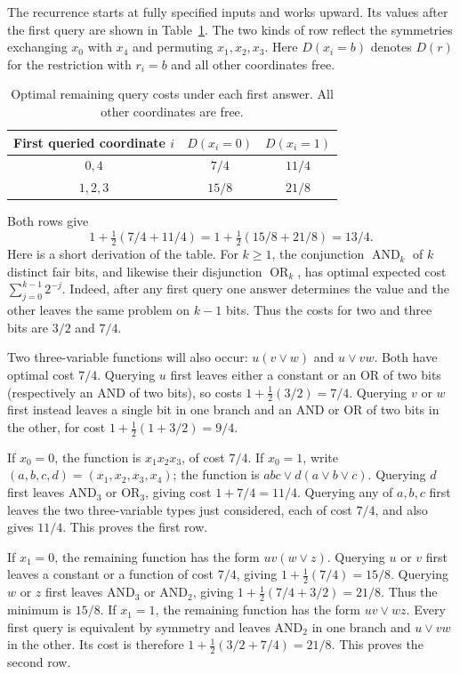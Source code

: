 \documentclass[11pt]{article}
\begin{document}
The recurrence starts at fully specified inputs and works upward. Its
values after the first query are shown in Table~\ref{tab:branches}.
The two kinds of row reflect the symmetries exchanging $x_0$ with $x_4$
and permuting $x_1,x_2,x_3$. Here $D(x_i=b)$ denotes $D(r)$ for the
restriction with $r_i=b$ and all other coordinates free.
\begin{table}[ht]
\centering
\begin{tabular}{ccc}
\toprule
First queried coordinate $i$ & $D(x_i=0)$ & $D(x_i=1)$\\
\midrule
$0,4$ & $7/4$ & $11/4$\\
$1,2,3$ & $15/8$ & $21/8$\\
\bottomrule
\end{tabular}
\caption{Optimal remaining query costs under each first answer.
All other coordinates are free.}\label{tab:branches}
\end{table}
Both rows give
\[
 1+\tfrac12(7/4+11/4)
 =1+\tfrac12(15/8+21/8)=13/4.
\]
Here is a short derivation of the table. For $k\geq1$, the conjunction
$\operatorname{AND}_k$ of $k$ distinct fair bits, and likewise their
disjunction $\operatorname{OR}_k$, has optimal expected cost
$\sum_{j=0}^{k-1}2^{-j}$. Indeed, after any first query one answer determines
the value and the other leaves the same problem on $k-1$ bits. Thus the
costs for two and three bits are $3/2$ and $7/4$.

Two three-variable functions will also occur: $u(v\lor w)$ and
$u\lor vw$. Both have optimal cost $7/4$. Querying $u$ first leaves either
a constant or an OR of two bits (respectively an AND of two bits), so costs
$1+\tfrac12(3/2)=7/4$. Querying $v$ or $w$ first instead leaves a single
bit in one branch and an AND or OR of two bits in the other, for cost
$1+\tfrac12(1+3/2)=9/4$.

If $x_0=0$, the function is $x_1x_2x_3$, of cost $7/4$.
If $x_0=1$, write $(a,b,c,d)=(x_1,x_2,x_3,x_4)$; the function is
$abc\lor d(a\lor b\lor c)$. Querying $d$ first leaves AND$_3$ or OR$_3$,
giving cost $1+7/4=11/4$. Querying any of $a,b,c$ first leaves the two
three-variable types just considered, each of cost $7/4$, and also gives
$11/4$. This proves the first row.

If $x_1=0$, the remaining function has the form $uv(w\lor z)$. Querying
$u$ or $v$ first leaves a constant or a function of cost $7/4$, giving
$1+\tfrac12(7/4)=15/8$. Querying $w$ or $z$ first leaves AND$_3$ or
AND$_2$, giving $1+\tfrac12(7/4+3/2)=21/8$. Thus the minimum is $15/8$.
If $x_1=1$, the remaining function has the form $uv\lor wz$. Every first
query is equivalent by symmetry and leaves AND$_2$ in one branch and
$u\lor vw$ in the other. Its cost is therefore
$1+\tfrac12(3/2+7/4)=21/8$. This proves the second row.
\end{document}
